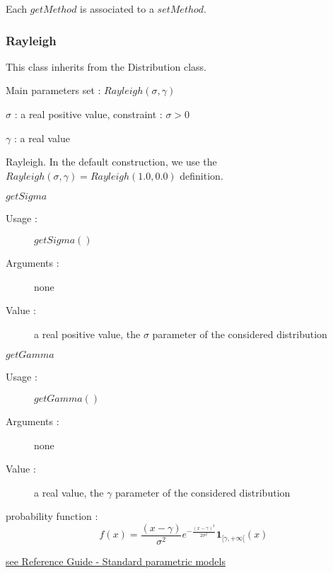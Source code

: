 Each  $getMethod$  is associated to a $setMethod$.

\newpage \subsubsection{Rayleigh}

This class inherits from the Distribution class.

\begin{description}

\item[Usage :] Main parameters set : $Rayleigh(\sigma, \gamma)$

\item[Arguments :]  \rule{0pt}{1em}
  \begin{description}
  \item $\sigma$ :  a real positive value, constraint : $\sigma > 0$
  \item $\gamma$ :  a real value
  \end{description}

\item[Value :] Rayleigh. In the default construction, we use the $Rayleigh(\sigma, \gamma) = Rayleigh(1.0, 0.0)$ definition.

\item[Some methods :]  \rule{0pt}{1em}
  \begin{description}

  \item $getSigma$
    \begin{description}
    \item[Usage :] $getSigma()$
    \item[Arguments :] none
    \item[Value :]  a real positive value, the  $\sigma$ parameter of the considered distribution
    \end{description}
    \bigskip
  \item $getGamma$
    \begin{description}
    \item[Usage :] $getGamma()$
    \item[Arguments :] none
    \item[Value :]  a real value, the  $\gamma$ parameter of the considered distribution
    \end{description}
    \bigskip
  \end{description}

\item[Details :]  \rule{0pt}{1em}
  \begin{description}
  \item probability function :
    $$
    f(x) = \frac{(x - \gamma)}{\sigma^2}e^{-\frac{(x-\gamma)^2}{2\sigma^2}}\boldsymbol{1}_{[\gamma,+\infty[}(x)
    $$
  \end{description}

\item[Links :]  \rule{0pt}{1em}
  \href{OpenTURNS_ReferenceGuide.pdf}{see Reference Guide - Standard parametric models}
\end{description}


